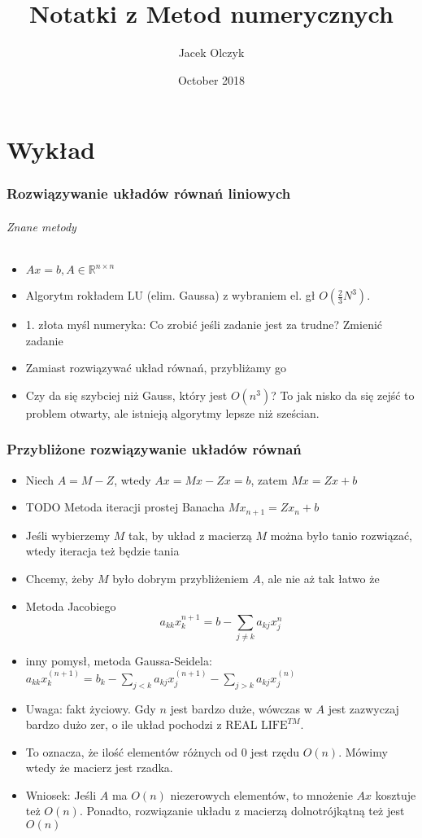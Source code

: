 \documentclass{article}
\title{Notatki z Metod numerycznych }
\author{Jacek Olczyk}
\date{October 2018}
\begin{document}
	\maketitle
	\part{Wykład}
	\section{Rozwiązywanie układów równań liniowych}
	\paragraph{Znane metody}
	\begin{itemize}
		\item $Ax=b, A\in\mathbb R^{n\times n}$
		\item Algorytm rokładem LU (elim. Gaussa) z wybraniem el. gł $O(\frac{2}{3}N^3)$.
		\item 1. złota myśl numeryka: Co zrobić jeśli zadanie jest za trudne? Zmienić zadanie
		\item Zamiast rozwiązywać układ równań, przybliżamy go
		\item Czy da się szybciej niż Gauss, który jest $O(n^3)$? To jak nisko da się zejść to problem otwarty, ale istnieją algorytmy lepsze niż sześcian.
	\end{itemize}

\section{Przybliżone rozwiązywanie układów równań}
\begin{itemize}
	\item Niech $ A=M-Z $, wtedy $ Ax=Mx-Zx=b $, zatem $ Mx=Zx+b $
	\item TODO Metoda iteracji prostej Banacha $Mx_{n+1} = Zx_{n}+b$
	\item Jeśli wybierzemy $ M $ tak, by układ z macierzą $ M $ można było tanio rozwiązać, wtedy iteracja też będzie tania
	\item Chcemy, żeby $ M $ było dobrym przybliżeniem $ A $, ale nie aż tak łatwo że
	\item Metoda Jacobiego $$a_{kk}x_{k}^{n+1}=b - \sum_{j\not=k} a_{kj}x_{j}^n$$
	\item inny pomysł, metoda Gaussa-Seidela: $a_{kk}x_k^{(n+1)} = b_k - \sum_{j<k}a_{kj}x_{j}^{(n+1)} - \sum_{j >k}a_{kj}x_{j}^{(n)}$
	\item Uwaga: fakt życiowy. Gdy $n$ jest bardzo duże, wówczas w $A$ jest zazwyczaj bardzo dużo zer, o ile układ pochodzi z $\text{REAL LIFE}^{TM}$.
	\item To oznacza, że ilość elementów różnych od $0$ jest rzędu $O(n)$. Mówimy wtedy że macierz jest rzadka.
	\item Wniosek: Jeśli $ A $ ma $ O(n) $ niezerowych elementów, to mnożenie $Ax$ kosztuje też $ O(n) $. Ponadto, rozwiązanie układu z macierzą dolnotrójkątną też jest $ O(n) $

\end{itemize}
\end{document}
